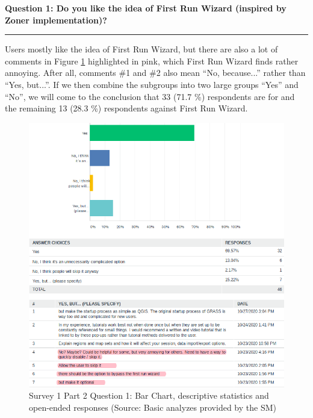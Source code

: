 \documentclass[a4paper,10pt,twoside]{article}
\begin{document}
\newpage
\noindent \textbf{Question 1: Do you like the idea of First Run Wizard (inspired by Zoner implementation)?}
\par\noindent\rule{\textwidth}{0.4pt}

\noindent Users mostly like the idea of First Run Wizard, but there
are also a lot of comments in Figure
\ref{fig:survey1_part2_question1_all} highlighted in pink, which First
Run Wizard finds rather annoying. After all, comments \#1 and \#2 also
mean ``No, because...'' rather than ``Yes, but...''. If we then
combine the subgroups into two large groups ``Yes'' and ``No'', we
will come to the conclusion that 33 (71.7 \%) respondents are for and
the remaining 13 (28.3 \%) respondents against First Run Wizard.

\vspace{0.3cm}
\begin{figure}[hbt!] 
\begin{center}
\includegraphics[width=15cm]{../surveys/analyzed_data/survey1_part2_question1_all.png} 
\caption[Survey 1 Part 2 Question 1: Bar Chart, descriptive statistics and open-ended responses]{Survey 1 Part 2 Question 1: Bar Chart, descriptive statistics and open-ended responses (Source: Basic analyzes provided by the SM)}
\label{fig:survey1_part2_question1_all}
\end{center}
\end{figure}
\end{document}
